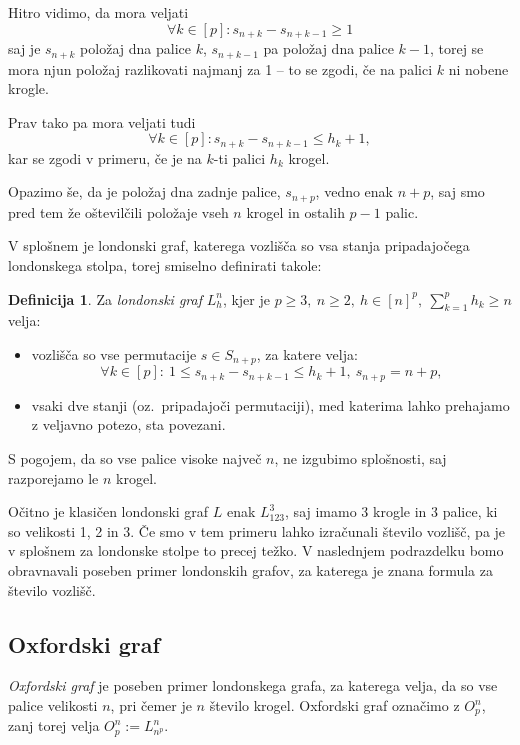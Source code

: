 \documentclass[12pt,a4paper]{amsart}
\theoremstyle{definition} %
\newtheorem{definicija}{Definicija}[section]
\theoremstyle{plain} %
\begin{document}
Hitro vidimo, da mora veljati 
\[\forall k \in [p]\colon s_{n+k} - s_{n+k-1} \geq 1 \]
saj je $s_{n+k}$ položaj dna palice $k$, $s_{n+k-1}$ pa položaj dna palice $k-1$, torej se mora njun položaj razlikovati najmanj za 1 -- to se zgodi, če na palici $k$ ni nobene krogle.

Prav tako pa mora veljati tudi 
\[\forall k \in [p]\colon s_{n+k} - s_{n+k-1} \leq h_k + 1,\]
kar se zgodi v primeru, če je na $k$-ti palici $h_k$ krogel.

Opazimo še, da je položaj dna zadnje palice, $s_{n+p}$, vedno enak $n+p$, saj smo pred tem že oštevilčili položaje vseh $n$ krogel in ostalih $p-1$ palic.

V splošnem je londonski graf, katerega vozlišča so vsa stanja pripadajočega londonskega stolpa, torej smiselno definirati takole:

\begin{definicija}
    Za \emph{londonski graf} $L_h^n$, kjer je $p \geq 3,\ n \geq 2,\ h \in [n]^p,\  \sum_{k=1}^p h_k \geq n$ velja:
    \begin{itemize}
        \item vozlišča so vse permutacije $s \in S_{n+p}$, za katere velja:
        \[\forall k \in [p]:\ 1 \leq s_{n+k} - s_{n+k-1} \leq h_k + 1,\ s_{n+p} = n + p ,\]
        \item vsaki dve stanji (oz.\ pripadajoči permutaciji), med katerima lahko prehajamo z veljavno potezo, sta povezani.
    \end{itemize}
\end{definicija}

S pogojem, da so vse palice visoke največ $n$, ne izgubimo splošnosti, saj razporejamo le $n$ krogel.

Očitno je klasičen londonski graf $L$ enak $L_{123}^3$, saj imamo 3 krogle in 3 palice, ki so velikosti 1, 2 in 3.
Če smo v tem primeru lahko izračunali število vozlišč, pa je v splošnem za londonske stolpe to precej težko. V naslednjem podrazdelku bomo obravnavali poseben primer londonskih grafov, za katerega je znana formula za število vozlišč. 

\subsection{Oxfordski graf}

\emph{Oxfordski graf} je poseben primer londonskega grafa, za katerega velja, da so vse palice velikosti $n$, pri čemer je $n$ število krogel. Oxfordski graf označimo z $O^n_p$, zanj torej velja $O^n_p := L^n_{n^p}$.
\end{document}
